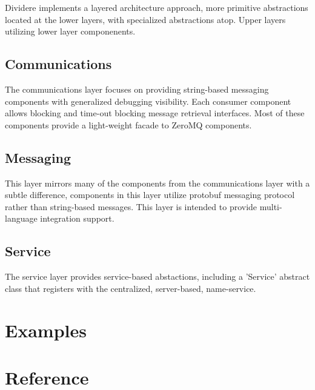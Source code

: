 \documentclass[fontsize=12pt]{book}
\newcommand{\insertPython}[1]{ 
\begin{tcolorbox}[title=#1,coltitle=lightgray,width=6in]

\end{tcolorbox}
}
\begin{document}
Dividere implements a layered architecture approach, more primitive abstractions located at the lower layers, with specialized abstractions atop.  Upper layers utilizing lower layer componenents.

\section{Communications}
The communications layer focuses on providing string-based messaging components with generalized debugging visibility.  Each consumer component allows blocking and time-out blocking message retrieval interfaces.  Most of these components provide a light-weight facade to ZeroMQ components.

\section{Messaging}
This layer mirrors many of the components from the communications layer with a subtle difference, components in this layer utilize protobuf messaging protocol rather than string-based messages.  This layer is intended to provide multi-language integration support.

\section{Service}
The service layer provides service-based abstactions, including a 'Service' abstract class that registers with the centralized, server-based, name-service.

\chapter{Examples}
\insertPython{simplePubSub.py}
\insertPython{msgReactor.py}

\chapter{Reference}

\end{document}
